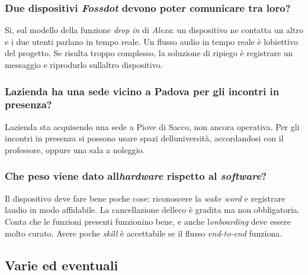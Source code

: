 \documentclass[12pt,a4paper]{article}
\begin{document}
\hypertarget{due-dispositivi-fossdot-devono-poter-comunicare-tra-loro}{%
\subsubsection{\texorpdfstring{Due dispositivi \emph{Fossdot} devono poter comunicare tra loro?}{Due dispositivi Fossdot devono poter comunicare tra loro?}}}

Sì, sul modello della funzione \emph{drop in} di \emph{Alexa}: un dispositivo ne contatta un altro e i due utenti parlano in tempo reale. Un flusso audio in tempo reale è l\textquotesingle obiettivo del progetto. Se risulta troppo complesso, la soluzione di ripiego è registrare un messaggio e riprodurlo sull\textquotesingle altro dispositivo.

\hypertarget{lazienda-ha-una-sede-vicino-a-padova-per-gli-incontri-in-presenza}{%
\subsubsection{L\textquotesingle azienda ha una sede vicino a Padova per gli incontri in presenza?}}

L\textquotesingle azienda sta acquisendo una sede a Piove di Sacco, non ancora operativa. Per gli incontri in presenza si possono usare spazi dell\textquotesingle università, accordandosi con il professore, oppure una sala a noleggio.

\hypertarget{che-peso-viene-dato-allhardware-rispetto-al-software}{%
\subsubsection{\texorpdfstring{Che peso viene dato all\textquotesingle{}\emph{hardware} rispetto al \emph{software}?}{Che peso viene dato all\textquotesingle hardware rispetto al software?}}}

Il dispositivo deve fare bene poche cose: riconoscere la \emph{wake word} e registrare l\textquotesingle audio in modo affidabile. La cancellazione dell\textquotesingle eco è gradita ma non obbligatoria. Conta che le funzioni presenti funzionino bene, e anche l\textquotesingle{}\emph{onboarding} deve essere molto curato. Avere poche \emph{skill} è accettabile se il flusso \emph{end-to-end} funziona.

\hypertarget{varie-ed-eventuali}{%
\subsection{Varie ed eventuali}}
\end{document}
